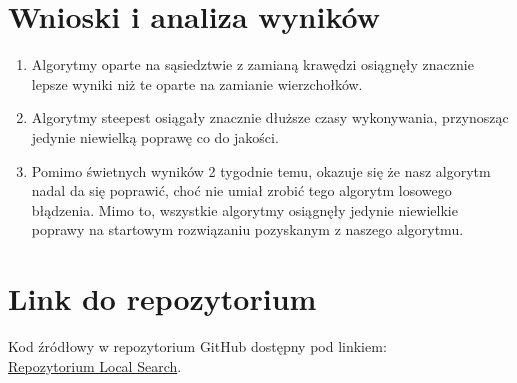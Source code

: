 \documentclass[11pt]{article}
\begin{document}
\section{Wnioski i analiza wyników}\label{sec:wnioski}

\begin{enumerate}
\item Algorytmy oparte na sąsiedztwie z zamianą krawędzi osiągnęły znacznie lepsze wyniki niż te oparte na zamianie wierzchołków.
\item Algorytmy steepest osiągały znacznie dłuższe czasy wykonywania, przynosząc jedynie niewielką poprawę co do jakości.
\item Pomimo świetnych wyników 2 tygodnie temu, okazuje się że nasz algorytm nadal da się poprawić, choć nie umiał zrobić tego algorytm losowego błądzenia.
Mimo to, wszystkie algorytmy osiągnęły jedynie niewielkie poprawy na startowym rozwiązaniu pozyskanym z naszego algorytmu.
\end{enumerate}


\section{Link do repozytorium}\label{sec:link-do-repo}
Kod źródłowy w repozytorium GitHub dostępny pod linkiem: \\
\href{https://github.com/KotZPolibudy/PUT_IMO/tree/main/Local_search}{Repozytorium Local Search}.
\end{document}
